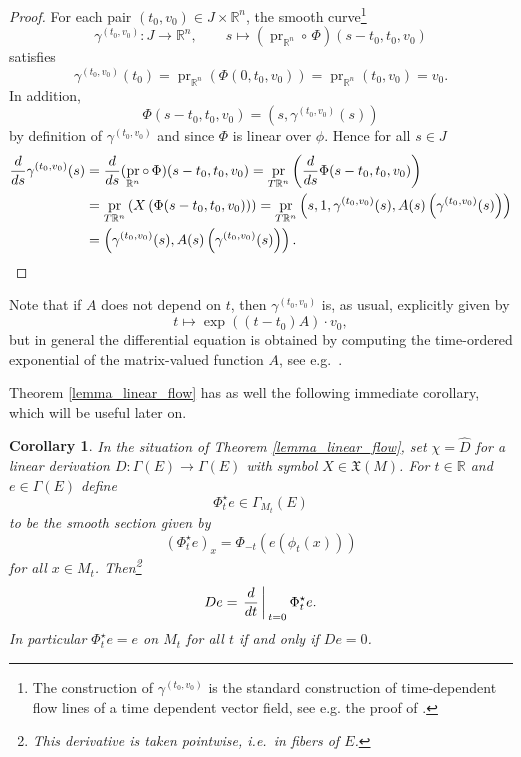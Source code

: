 \documentclass{amsart}
\theoremstyle{plain}
\newtheorem{corollary}[theorem]{Corollary}
\newcommand{\R}{\mathbb{R}}
\newcommand{\mx}{\mathfrak{X}}
\newcommand{\an}[1]{\arrowvert_{#1}}
\DeclareMathOperator{\pr}{pr}
\begin{document}
\begin{proof}
For each pair $(t_0,v_0)\in J\times \R^n$, the smooth curve\footnote{The construction of $\gamma^{(t_0,v_0)}$ is the standard construction of time-dependent flow lines of a time dependent vector field, see e.g. the proof of \cite[Theorem 9.48]{Lee13}. 
}
\[\gamma^{(t_0,v_0)}\colon J\to\R^n, \qquad s\mapsto (\pr_{\R^n}\circ\, \Phi)(s-t_0, t_0, v_0)
\]
satisfies 
\[ \gamma^{(t_0,v_0)}(t_0)=\pr_{\R^n}\left(\Phi(0, t_0, v_0)\right)=\pr_{\R^n}(t_0,v_0)=v_0.
\]
In addition, 
\[  \Phi(s-t_0, t_0, v_0)=\left(s, \gamma^{(t_0,v_0)}(s)\right)
\]
by definition of $\gamma^{(t_0,v_0)}$ and since $\Phi$ is linear over $\phi$. Hence 
for all $s\in J$
\begin{equation*}
\begin{split}
\frac{d}{ds}\gamma^{(t_0,v_0)}(s)&=\frac{d}{ds}(\pr_{\R^n}\circ\, \Phi)(s-t_0, t_0, v_0)=\pr_{T\R^n}\left(
\frac{d}{ds}\Phi(s-t_0, t_0, v_0)
\right)\\
&=\pr_{T\R^n}\left(
X\left(\Phi(s-t_0, t_0, v_0)\right)\right)=\pr_{T\R^n}\left(s, 1, \gamma^{(t_0,v_0)}(s), A(s)\left(\gamma^{(t_0,v_0)}(s)\right)
\right)\\
&=\left(\gamma^{(t_0,v_0)}(s), A(s)\left(\gamma^{(t_0,v_0)}(s)\right)
\right).\qedhere
\end{split}
\end{equation*}
\end{proof}
Note that if $A$ does not depend on $t$, then $\gamma^{(t_0,v_0)}$ is, as usual, explicitly given by 
\[ t\mapsto 
\exp((t-t_0)A)\cdot v_0,\] 
but in general the differential equation is obtained by computing the time-ordered exponential of the matrix-valued function $A$, see e.g.~\cite{Lam98}.


\bigskip

Theorem \ref{lemma_linear_flow} has as well the following immediate corollary, which will be useful later on.
\begin{corollary}\label{lemma_flat_sections}
In the situation of Theorem \ref{lemma_linear_flow}, set $\chi=\widehat{D}$ for a linear derivation $D\colon \Gamma(E)\to\Gamma(E)$ with symbol $X\in\mx(M)$. For $t\in \R$ and $e\in\Gamma(E)$ define 
\[ \Phi_t^\star e \in \Gamma_{M_t}(E)
\]
to be the smooth section given by
\[ (\Phi_t^\star e)_x= \Phi_{-t}(e(\phi_t(x)))
\]
for all $x\in M_t$. Then\footnote{This derivative is taken pointwise, i.e.~in fibers of $E$.}
\[ De=\left.\frac{d}{dt}\right\an{t=0} \Phi_t^\star e.
\]
In particular $\Phi_t^\star e = e$ on $M_t$ for all $t$ if and only if $De=0$. 
\end{corollary}
\end{document}
